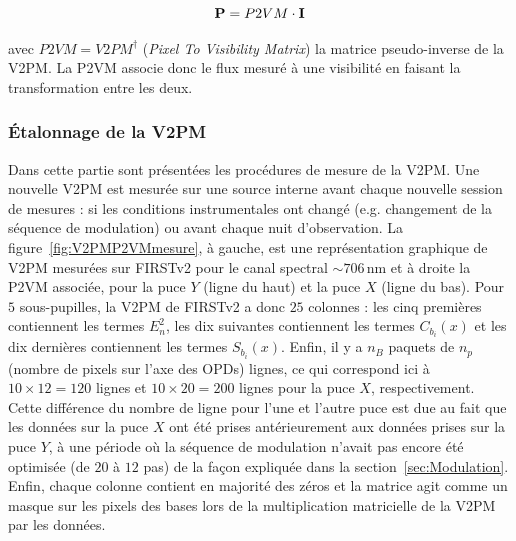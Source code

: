 \begin{equation}
    \text{\textbf{P}} = P2VM \cdot \text{\textbf{I}} \label{eq:VisibiliteMes}
\end{equation}

avec $P2VM = V2PM^\dag$ (\textit{Pixel To Visibility Matrix}) la matrice pseudo-inverse de la \ac{V2PM}. La \ac{P2VM} associe donc le flux mesuré à une visibilité en faisant la transformation entre les deux.


\subsubsection{Étalonnage de la V2PM}
\label{sec:V2PMEtalonnage}

Dans cette partie sont présentées les procédures de mesure de la \ac{V2PM}. Une nouvelle \ac{V2PM} est mesurée sur une source interne avant chaque nouvelle session de mesures : si les conditions instrumentales ont changé (e.g. changement de la séquence de modulation) ou avant chaque nuit d'observation. La figure~\ref{fig:V2PMP2VMmesure}, à gauche, est une représentation graphique de \ac{V2PM} mesurées sur \ac{FIRSTv2} pour le canal spectral $\sim 706 \,$nm et à droite la \ac{P2VM} associée, pour la puce $Y$ (ligne du haut) et la puce $X$ (ligne du bas). Pour $5$ sous-pupilles, la \ac{V2PM} de \ac{FIRSTv2} a donc $25$ colonnes : les cinq premières contiennent les termes $E_{n}^2$, les dix suivantes contiennent les termes $C_{b_i}(x)$ et les dix dernières contiennent les termes $S_{b_i}(x)$. Enfin, il y a $n_B$ paquets de $n_p$ (nombre de pixels sur l'axe des \ac{OPD}s) lignes, ce qui correspond ici à $10 \times 12 = 120$ lignes et $10 \times 20 = 200$ lignes pour la puce $X$, respectivement. Cette différence du nombre de ligne pour l'une et l'autre puce est due au fait que les données sur la puce $X$ ont été prises antérieurement aux données prises sur la puce $Y$, à une période où la séquence de modulation n'avait pas encore été optimisée (de $20$ à $12$ pas) de la façon expliquée dans la section~\ref{sec:Modulation}. Enfin, chaque colonne contient en majorité des zéros et la matrice agit comme un masque sur les pixels des bases lors de la multiplication matricielle de la \ac{V2PM} par les données.

